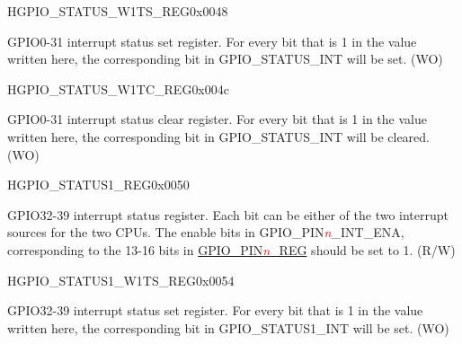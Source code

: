 \begin{register}{H}{GPIO\_STATUS\_W1TS\_REG}{0x0048}\label{regdesc:GPIOSTATUSW1TSREG}
%
\regnewline%
\begin{regdesc}\begin{reglist}
\item [GPIO\_STATUS\_INT\_W1TS]GPIO0-31 interrupt status set register. For every bit that is 1 in the value written here, the corresponding bit in GPIO\_STATUS\_INT will be set. (WO)
\end{reglist}\end{regdesc}
\end{register}


\begin{register}{H}{GPIO\_STATUS\_W1TC\_REG}{0x004c}\label{regdesc:GPIOSTATUSW1TCREG}
%
\regnewline%
\begin{regdesc}\begin{reglist}
\item [GPIO\_STATUS\_INT\_W1TC]GPIO0-31 interrupt status clear register. For every bit that is 1 in the value written here, the corresponding bit in GPIO\_STATUS\_INT will be cleared. (WO)
\end{reglist}\end{regdesc}
\end{register}


\begin{register}{H}{GPIO\_STATUS1\_REG}{0x0050}\label{regdesc:GPIOSTATUS1REG}
%
%
\regnewline%
\begin{regdesc}\begin{reglist}
\item [GPIO\_STATUS1\_INT]GPIO32-39 interrupt status register. Each bit can be either of the two interrupt sources for the two CPUs. The enable bits in GPIO\_PIN\textcolor{red}{\it{n}}\_INT\_ENA, corresponding to the 13-16 bits in \hyperref[regdesc:GPIOPINnREG]{GPIO\_PIN\textcolor{red}{\it{n}}\_REG} should be set to 1. (R/W)
\end{reglist}\end{regdesc}
\end{register}


\begin{register}{H}{GPIO\_STATUS1\_W1TS\_REG}{0x0054}\label{regdesc:GPIOSTATUS1W1TSREG}
%
%
\regnewline%
\begin{regdesc}\begin{reglist}
\item [GPIO\_STATUS1\_INT\_W1TS]GPIO32-39 interrupt status set register. For every bit that is 1 in the value written here, the corresponding bit in GPIO\_STATUS1\_INT will be set. (WO)
\end{reglist}\end{regdesc}
\end{register}


